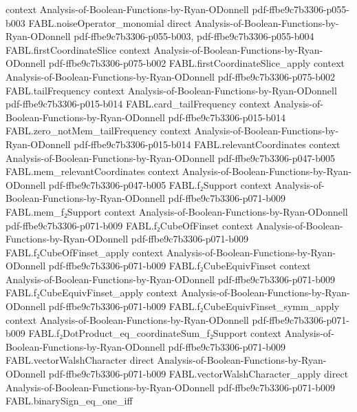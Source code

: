 \begin{theorem}
  {context}
  {Analysis-of-Boolean-Functions-by-Ryan-ODonnell}
  {pdf-ffbe9c7b3306-p055-b003}
\proofstep
  {FABL.noiseOperator_monomial}
  {direct}
  {Analysis-of-Boolean-Functions-by-Ryan-ODonnell}
  {pdf-ffbe9c7b3306-p055-b003,
    pdf-ffbe9c7b3306-p055-b004}
\proofstep
  {FABL.firstCoordinateSlice}
  {context}
  {Analysis-of-Boolean-Functions-by-Ryan-ODonnell}
  {pdf-ffbe9c7b3306-p075-b002}
\proofstep
  {FABL.firstCoordinateSlice_apply}
  {context}
  {Analysis-of-Boolean-Functions-by-Ryan-ODonnell}
  {pdf-ffbe9c7b3306-p075-b002}
\proofstep
  {FABL.tailFrequency}
  {context}
  {Analysis-of-Boolean-Functions-by-Ryan-ODonnell}
  {pdf-ffbe9c7b3306-p015-b014}
\proofstep
  {FABL.card_tailFrequency}
  {context}
  {Analysis-of-Boolean-Functions-by-Ryan-ODonnell}
  {pdf-ffbe9c7b3306-p015-b014}
\proofstep
  {FABL.zero_notMem_tailFrequency}
  {context}
  {Analysis-of-Boolean-Functions-by-Ryan-ODonnell}
  {pdf-ffbe9c7b3306-p015-b014}
\proofstep
  {FABL.relevantCoordinates}
  {context}
  {Analysis-of-Boolean-Functions-by-Ryan-ODonnell}
  {pdf-ffbe9c7b3306-p047-b005}
\proofstep
  {FABL.mem_relevantCoordinates}
  {context}
  {Analysis-of-Boolean-Functions-by-Ryan-ODonnell}
  {pdf-ffbe9c7b3306-p047-b005}
\proofstep
  {FABL.f₂Support}
  {context}
  {Analysis-of-Boolean-Functions-by-Ryan-ODonnell}
  {pdf-ffbe9c7b3306-p071-b009}
\proofstep
  {FABL.mem_f₂Support}
  {context}
  {Analysis-of-Boolean-Functions-by-Ryan-ODonnell}
  {pdf-ffbe9c7b3306-p071-b009}
\proofstep
  {FABL.f₂CubeOfFinset}
  {context}
  {Analysis-of-Boolean-Functions-by-Ryan-ODonnell}
  {pdf-ffbe9c7b3306-p071-b009}
\proofstep
  {FABL.f₂CubeOfFinset_apply}
  {context}
  {Analysis-of-Boolean-Functions-by-Ryan-ODonnell}
  {pdf-ffbe9c7b3306-p071-b009}
\proofstep
  {FABL.f₂CubeEquivFinset}
  {context}
  {Analysis-of-Boolean-Functions-by-Ryan-ODonnell}
  {pdf-ffbe9c7b3306-p071-b009}
\proofstep
  {FABL.f₂CubeEquivFinset_apply}
  {context}
  {Analysis-of-Boolean-Functions-by-Ryan-ODonnell}
  {pdf-ffbe9c7b3306-p071-b009}
\proofstep
  {FABL.f₂CubeEquivFinset_symm_apply}
  {context}
  {Analysis-of-Boolean-Functions-by-Ryan-ODonnell}
  {pdf-ffbe9c7b3306-p071-b009}
\proofstep
  {FABL.f₂DotProduct_eq_coordinateSum_f₂Support}
  {context}
  {Analysis-of-Boolean-Functions-by-Ryan-ODonnell}
  {pdf-ffbe9c7b3306-p071-b009}
\proofstep
  {FABL.vectorWalshCharacter}
  {direct}
  {Analysis-of-Boolean-Functions-by-Ryan-ODonnell}
  {pdf-ffbe9c7b3306-p071-b009}
\proofstep
  {FABL.vectorWalshCharacter_apply}
  {direct}
  {Analysis-of-Boolean-Functions-by-Ryan-ODonnell}
  {pdf-ffbe9c7b3306-p071-b009}
\proofstep
  {FABL.binarySign_eq_one_iff}

\end{theorem}
